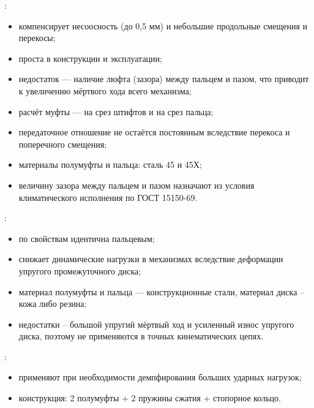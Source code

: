 :
\begin{itemize}
	\item компенсирует несоосность (до 0,5 мм) и небольшие продольные смещения и перекосы;
	\item проста в конструкции и эксплуатации;
	\item недостаток --- наличие люфта (зазора) между пальцем и пазом, что приводит к увеличению мёртвого хода всего механизма;
	\item расчёт муфты --- на срез штифтов и на срез пальца;
	\item передаточное отношение не остаётся постоянным вследствие перекоса и поперечного смещения;
	\item материалы полумуфты и пальца: сталь 45 и 45Х;
	\item величину зазора между	пальцем и пазом назначают из условия климатического	исполнения по ГОСТ 15150-69.
\end{itemize}

:
\begin{itemize}
	\item по свойствам идентична пальцевым;
	\item снижает динамические нагрузки в механизмах вследствие деформации упругого промежуточного диска;
	\item материал полумуфты и пальца --- конструкционные стали, материал диска – кожа либо резина;
	\item недостатки – большой упругий мёртвый ход и усиленный износ упругого диска, поэтому не применяются в точных кинематических цепях.
\end{itemize}

:
\begin{itemize}
	\item применяют при необходимости демпфирования больших ударных нагрузок;
	\item конструкция: 2 полумуфты + 2 пружины сжатия + стопорное кольцо.
\end{itemize}

